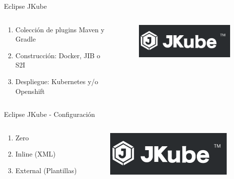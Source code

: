 \documentclass[aspectratio=169]{beamer}
\begin{document}
\begin{frame}{Eclipse JKube}
	\begin{columns}[T] %
		
		\begin{column}[T]{4cm} %
		\begin{enumerate}
			\item Colección de plugins Maven y Gradle
			\item Construcción: Docker, JIB o S2I
            \item Despliegue: Kubernetes y/o Openshift
		\end{enumerate}
		\end{column}
		\begin{column}[T]{6cm} %
\begin{figure}
\centering
\includegraphics[width=0.7\linewidth]{Images/jkube}
\end{figure}
			
		\end{column}
	\end{columns}
\end{frame}

\begin{frame}{Eclipse JKube - Configuración}
	\begin{columns}[T] %
		
		\begin{column}[T]{4cm} %
		\begin{enumerate}
			\item Zero
			\item Inline (XML)
            \item External (Plantillas)
		\end{enumerate}
		\end{column}
		\begin{column}[T]{6cm} %
\begin{figure}
\centering
\includegraphics[width=0.7\linewidth]{Images/jkube}
\end{figure}
			
		\end{column}
	\end{columns}
\end{frame}
\end{document}
